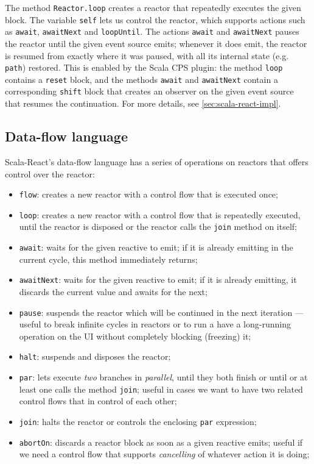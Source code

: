 The method \texttt{Reactor.loop} creates a reactor that repeatedly executes the given block. The variable \texttt{self} lets us control the reactor, which supports actions such as \texttt{await}, \texttt{awaitNext} and \texttt{loopUntil}. The actions \texttt{await} and \texttt{awaitNext} pauses the reactor until the given event source emits; whenever it does emit, the reactor is resumed from exactly where it was paused, with all its internal state (e.g. \texttt{path}) restored. This is enabled by the Scala CPS plugin: the method \texttt{loop} contains a \texttt{reset} block, and the methods \texttt{await} and \texttt{awaitNext} contain a corresponding \texttt{shift} block that creates an observer on the given event source that resumes the continuation. For more details, see \ref{sec:scala-react-impl}.

\subsection{Data-flow language}

Scala-React's data-flow language has a series of operations on reactors that offers control over the reactor:
\begin{itemize}
\item \texttt{flow}: creates a new reactor with a control flow that is executed once;
\item \texttt{loop}: creates a new reactor with a control flow that is repeatedly executed, until the reactor is disposed or the reactor calls the \texttt{join} method on itself;
\item \texttt{await}: waits for the given reactive to emit; if it is already emitting in the current cycle, this method immediately returns;
\item \texttt{awaitNext}: waits for the given reactive to emit; if it is already emitting, it discards the current value and awaits for the next;
\item \texttt{pause}: suspends the reactor which will be continued in the next iteration --- useful to break infinite cycles in reactors or to run a have a long-running operation on the UI without completely blocking (freezing) it;
\item \texttt{halt}: suspends and disposes the reactor;
\item \texttt{par}: lets execute \emph{two} branches in \emph{parallel}, until they both finish or until or at least one calls the method \texttt{join}; useful in cases we want to have two related control flows that in control of each other;
\item \texttt{join}: halts the reactor or controls the enclosing \texttt{par} expression;
\item \texttt{abortOn}: discards a reactor block as soon as a given reactive emits; useful if we need a control flow that supports \emph{cancelling} of whatever action it is doing;
\end{itemize}

